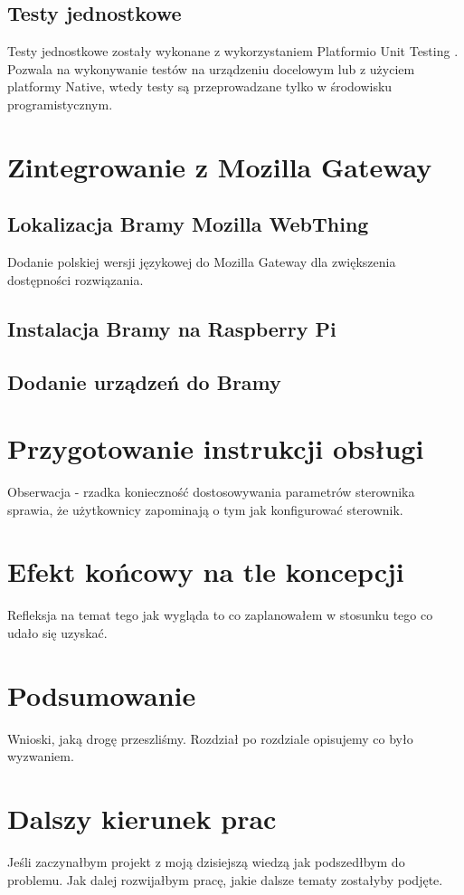 \documentclass[11pt]{report}
\begin{document}
 \section{Testy jednostkowe}
 Testy jednostkowe zostały wykonane z wykorzystaniem Platformio Unit Testing \cite{PIOUnitTesting}. Pozwala na wykonywanie testów na urządzeniu docelowym lub z użyciem platformy Native, wtedy testy są przeprowadzane tylko w środowisku programistycznym.

 
 \chapter{Zintegrowanie z Mozilla Gateway}
 \section{Lokalizacja Bramy Mozilla WebThing}
 Dodanie polskiej wersji językowej do Mozilla Gateway dla zwiększenia dostępności rozwiązania.
 \section{Instalacja Bramy na Raspberry Pi}
 \section{Dodanie urządzeń do Bramy}
 
 \chapter{Przygotowanie instrukcji obsługi}
 Obserwacja - rzadka konieczność dostosowywania parametrów sterownika sprawia, że użytkownicy zapominają o tym jak konfigurować sterownik.
 
 
 \chapter{Efekt końcowy na tle koncepcji}
 Refleksja na temat tego jak wygląda to co zaplanowałem w stosunku tego co udało się uzyskać.
 
 
 \chapter*{Podsumowanie}
 Wnioski, jaką drogę przeszliśmy. Rozdział po rozdziale opisujemy co było wyzwaniem.
 
 
 \chapter*{Dalszy kierunek prac}
 Jeśli zaczynałbym projekt z moją dzisiejszą wiedzą jak podszedłbym do problemu. Jak dalej rozwijałbym pracę, jakie dalsze tematy zostałyby podjęte. 
\end{document}
